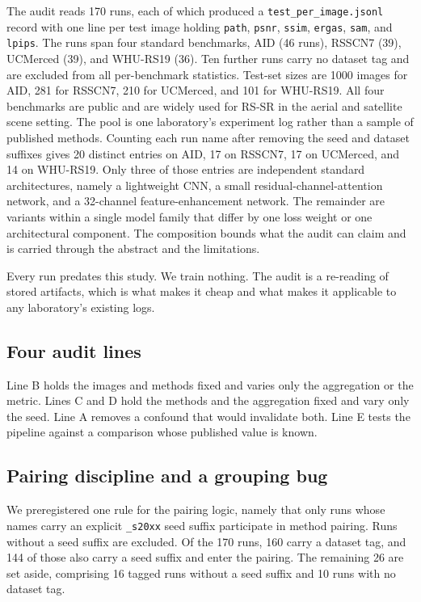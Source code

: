 \documentclass[pdflatex,sn-nature]{sn-jnl}
\begin{document}
The audit reads 170 runs, each of which produced a \texttt{test\_\allowbreak per\_\allowbreak image.jsonl} record with one line per test image holding \texttt{path}, \texttt{psnr}, \texttt{ssim}, \texttt{ergas}, \texttt{sam}, and \texttt{lpips}. The runs span four standard benchmarks, AID (46 runs), RSSCN7 (39), UCMerced (39), and WHU-RS19 (36). Ten further runs carry no dataset tag and are excluded from all per-benchmark statistics. Test-set sizes are 1000 images for AID, 281 for RSSCN7, 210 for UCMerced, and 101 for WHU-RS19. All four benchmarks are public and are widely used for RS-SR in the aerial and satellite scene setting. The pool is one laboratory's experiment log rather than a sample of published methods. Counting each run name after removing the seed and dataset suffixes gives 20 distinct entries on AID, 17 on RSSCN7, 17 on UCMerced, and 14 on WHU-RS19. Only three of those entries are independent standard architectures, namely a lightweight CNN, a small residual-channel-attention network, and a 32-channel feature-enhancement network. The remainder are variants within a single model family that differ by one loss weight or one architectural component. The composition bounds what the audit can claim and is carried through the abstract and the limitations.

Every run predates this study. We train nothing. The audit is a re-reading of stored artifacts, which is what makes it cheap and what makes it applicable to any laboratory's existing logs.

\subsection{Four audit lines}\label{sec:lines}

Line B holds the images and methods fixed and varies only the aggregation or the metric. Lines C and D hold the methods and the aggregation fixed and vary only the seed. Line A removes a confound that would invalidate both. Line E tests the pipeline against a comparison whose published value is known.

\subsection{Pairing discipline and a grouping bug}\label{sec:pairing}

We preregistered one rule for the pairing logic, namely that only runs whose names carry an explicit \texttt{\_\allowbreak s20xx} seed suffix participate in method pairing. Runs without a seed suffix are excluded. Of the 170 runs, 160 carry a dataset tag, and 144 of those also carry a seed suffix and enter the pairing. The remaining 26 are set aside, comprising 16 tagged runs without a seed suffix and 10 runs with no dataset tag.
\end{document}
